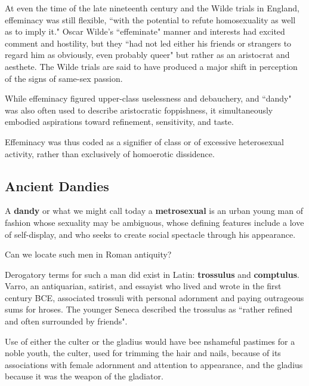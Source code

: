 At even the time of the late nineteenth century and the Wilde trials in England, effeminacy was still flexible, ``with the potential to refute homosexuality as well as to imply it." Oscar Wilde's ``effeminate" manner and interests had excited comment and hostility, but they ``had not led either his friends or strangers to regard him as obviously, even probably queer" but rather as an aristocrat and aesthete. The Wilde trials are said to have produced a major shift in perception of the signs of same-sex passion.

\begin{rmk}
    While effeminacy figured upper-class uselessness and debauchery, and ``dandy" was also often used to describe aristocratic foppishness, it simultaneously embodied aspirations toward refinement, sensitivity, and taste.
\end{rmk}

Effeminacy was thus coded as a signifier of class or of excessive heterosexual activity, rather than exclusively of homoerotic dissidence.


\subsection{Ancient Dandies}

\begin{defn}
    A \textbf{dandy} or what we might call today a \textbf{metrosexual} is an urban young man of fashion whose sexuality may be ambiguous, whose defining features include a love of self-display, and who seeks to create social spectacle through his appearance.
\end{defn}

\begin{qst}
    Can we locate such men in Roman antiquity?
\end{qst}

Derogatory terms for such a man did exist in Latin: \textbf{trossulus} and \textbf{comptulus}. Varro, an antiquarian, satirist, and essayist who lived and wrote in the first century BCE, associated trossuli with personal adornment and paying outrageous sums for hroses. The younger Seneca described the trossulus as ``rather refined and often surrounded by friends".

\begin{rmk}
    Use of either the culter or the gladius would have bee nshameful pastimes for a noble youth, the culter, used for trimming the hair and nails, because of its associations with female adornment and attention to appearance, and the gladius because it was the weapon of the gladiator. 
\end{rmk}

